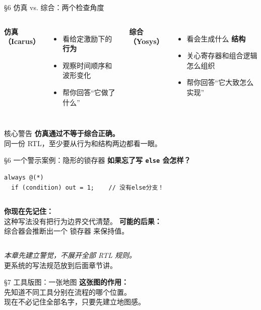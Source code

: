 \documentclass[aspectratio=169]{beamer}
\begin{document}
\begin{frame}{\S6 仿真 vs. 综合：两个检查角度}
\begin{columns}
\textbf{仿真（Icarus）}
\begin{itemize}
  \item 看给定激励下的 \textbf{行为}
  \item 观察时间顺序和波形变化
  \item 帮你回答“它做了什么”
\end{itemize}
\textbf{综合（Yosys）}
\begin{itemize}
  \item 看会生成什么 \textbf{结构}
  \item 关心寄存器和组合逻辑怎么组织
  \item 帮你回答“它大致怎么实现”
\end{itemize}
\end{columns}
\vspace{0.8em}
\begin{alertblock}{核心警告}
\textbf{仿真通过不等于综合正确。}\\
同一份 RTL，至少要从行为和结构两边都看一眼。
\end{alertblock}
\end{frame}

\begin{frame}[fragile]{\S6 一个警示案例：隐形的锁存器}
\textbf{如果忘了写 \texttt{else} 会怎样？}
\begin{verbatim}
always @(*)
  if (condition) out = 1;    // 没有else分支！
\end{verbatim}

\vspace{0.5em}
\begin{columns}
\textbf{你现在先记住：}\\
这种写法没有把行为边界交代清楚。
\textbf{可能的后果：}\\
综合器会推断出一个 \alert{锁存器} 来保持值。
\end{columns}

\vspace{0.8em}
\centering
\textit{本章先建立警觉，不展开全部 RTL 规则。}\\
更系统的写法规范放到后面章节讲。
\end{frame}

\begin{frame}{\S7 工具版图：一张地图}
\centering
\textbf{这张图的作用：}\\
先知道不同工具分别在流程的哪个位置。\\
现在不必记住全部名字，只要先建立地图感。
\end{frame}
\end{document}
